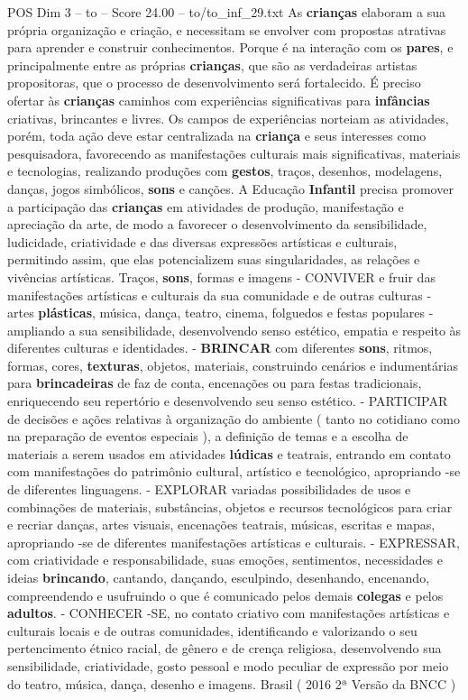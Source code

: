 \begin{textsample}{POS Dim 3 – to – Score 24.00 – to/to\_inf\_29.txt}
As \textbf{crianças} elaboram a sua própria organização e criação, e necessitam se envolver com propostas atrativas para aprender e construir conhecimentos.
Porque é na interação com os \textbf{pares}, e principalmente entre as próprias \textbf{crianças}, que são as verdadeiras artistas propositoras, que o processo de desenvolvimento será fortalecido.
É preciso ofertar às \textbf{crianças} caminhos com experiências significativas para \textbf{infâncias} criativas, brincantes e livres.
Os campos de experiências norteiam as atividades, porém, toda ação deve estar centralizada na \textbf{criança} e seus interesses como pesquisadora, favorecendo as manifestações culturais mais significativas, materiais e tecnologias, realizando produções com \textbf{gestos}, traços, desenhos, modelagens, danças, jogos simbólicos, \textbf{sons} e canções.
A Educação \textbf{Infantil} precisa promover a participação das \textbf{crianças} em atividades de produção, manifestação e apreciação da arte, de modo a favorecer o desenvolvimento da sensibilidade, ludicidade, criatividade e das diversas expressões artísticas e culturais, permitindo assim, que elas potencializem suas singularidades, as relações e vivências artísticas.
Traços, \textbf{sons}, formas e imagens - CONVIVER e fruir das manifestações artísticas e culturais da sua comunidade e de outras culturas - artes \textbf{plásticas}, música, dança, teatro, cinema, folguedos e festas populares - ampliando a sua sensibilidade, desenvolvendo senso estético, empatia e respeito às diferentes culturas e identidades. - \textbf{BRINCAR} com diferentes \textbf{sons}, ritmos, formas, cores, \textbf{texturas}, objetos, materiais, construindo cenários e indumentárias para \textbf{brincadeiras} de faz de conta, encenações ou para festas tradicionais, enriquecendo seu repertório e desenvolvendo seu senso estético. - PARTICIPAR de decisões e ações relativas à organização do ambiente ( tanto no cotidiano como na preparação de eventos especiais ), a definição de temas e a escolha de materiais a serem usados em atividades \textbf{lúdicas} e teatrais, entrando em contato com manifestações do patrimônio cultural, artístico e tecnológico, apropriando -se de diferentes linguagens. - EXPLORAR variadas possibilidades de usos e combinações de materiais, substâncias, objetos e recursos tecnológicos para criar e recriar danças, artes visuais, encenações teatrais, músicas, escritas e mapas, apropriando -se de diferentes manifestações artísticas e culturais. - EXPRESSAR, com criatividade e responsabilidade, suas emoções, sentimentos, necessidades e ideias \textbf{brincando}, cantando, dançando, esculpindo, desenhando, encenando, compreendendo e usufruindo o que é comunicado pelos demais \textbf{colegas} e pelos \textbf{adultos}. - CONHECER -SE, no contato criativo com manifestações artísticas e culturais locais e de outras comunidades, identificando e valorizando o seu pertencimento étnico racial, de gênero e de crença religiosa, desenvolvendo sua sensibilidade, criatividade, gosto pessoal e modo peculiar de expressão por meio do teatro, música, dança, desenho e imagens.
Brasil ( 2016 2ª Versão da BNCC )


\end{textsample}
